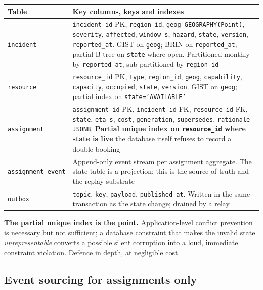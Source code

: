 \begin{center}\footnotesize
\begin{tabular}{@{}lp{86mm}@{}}
\toprule
\textbf{Table} & \textbf{Key columns, keys and indexes} \\
\midrule
\texttt{incident} &
\texttt{incident\_id} PK, \texttt{region\_id}, \texttt{geog GEOGRAPHY(Point)},
\texttt{severity}, \texttt{affected}, \texttt{window\_s}, \texttt{hazard},
\texttt{state}, \texttt{version}, \texttt{reported\_at}.
GIST on \texttt{geog}; BRIN on \texttt{reported\_at}; partial B-tree on
\texttt{state} where open. Partitioned monthly by \texttt{reported\_at},
sub-partitioned by \texttt{region\_id} \\
\addlinespace
\texttt{resource} &
\texttt{resource\_id} PK, \texttt{type}, \texttt{region\_id}, \texttt{geog},
\texttt{capability}, \texttt{capacity}, \texttt{occupied}, \texttt{state},
\texttt{version}. GIST on \texttt{geog}; partial index on
\texttt{state='AVAILABLE'} \\
\addlinespace
\texttt{assignment} &
\texttt{assignment\_id} PK, \texttt{incident\_id} FK, \texttt{resource\_id} FK,
\texttt{state}, \texttt{eta\_s}, \texttt{cost}, \texttt{generation},
\texttt{supersedes}, \texttt{rationale JSONB}.
\textbf{Partial unique index on \texttt{resource\_id} where state is live}
\textemdash{} the database itself refuses to record a double-booking \\
\addlinespace
\texttt{assignment\_event} &
Append-only event stream per assignment aggregate. The state table is a
projection; this is the source of truth and the replay substrate \\
\addlinespace
\texttt{outbox} &
\texttt{topic}, \texttt{key}, \texttt{payload}, \texttt{published\_at}.
Written in the same transaction as the state change; drained by a relay \\
\bottomrule
\end{tabular}
\end{center}

\begin{keybox}
\textbf{The partial unique index is the point.} Application-level conflict
prevention is necessary but not sufficient; a database constraint that makes
the invalid state \emph{unrepresentable} converts a possible silent corruption
into a loud, immediate constraint violation. Defence in depth, at negligible cost.
\end{keybox}

\subsection{Event sourcing for assignments only}

